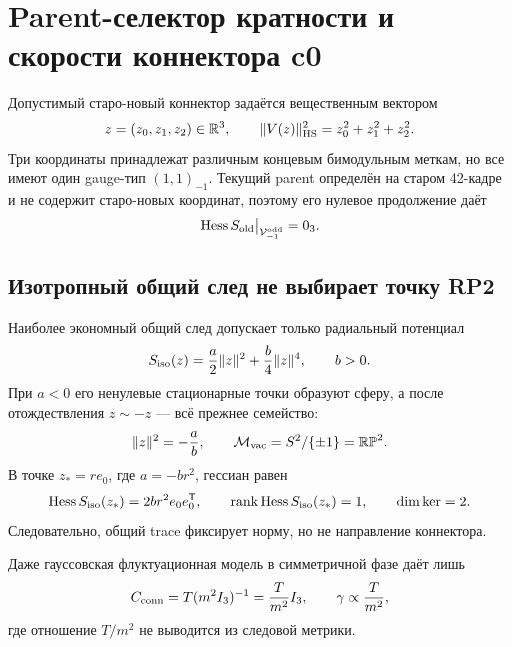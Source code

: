 \chapter{Parent-селектор кратности и скорости коннектора c0}
\label{ch:v8-baryon-c0-connector-multiplicity-and-rate-parent-selector-gate}

Допустимый старо-новый коннектор задаётся вещественным вектором
\begin{equation}
 z=(z_0,z_1,z_2)\in\mathbb R^3,
 \qquad \lVert V(z)\rVert_{\rm HS}^2=z_0^2+z_1^2+z_2^2.
 \label{eq:v8-baryon-c0-connector-multiplicity-trace-norm}
\end{equation}
Три координаты принадлежат различным концевым бимодульным меткам, но все
имеют один gauge-тип $(1,1)_{-1}$. Текущий parent определён на старом
42-кадре и не содержит старо-новых координат, поэтому его нулевое
продолжение даёт
\begin{equation}
 \operatorname{Hess} S_{\rm old}\big|_{\mathcal V_{-1}^{\rm odd}}=0_3.
 \label{eq:v8-baryon-c0-old-parent-zero-connector-hessian}
\end{equation}

\section{Изотропный общий след не выбирает точку RP2}

Наиболее экономный общий след допускает только радиальный потенциал
\begin{equation}
 S_{\rm iso}(z)=\frac a2\lVert z\rVert^2
 +\frac b4\lVert z\rVert^4,
 \qquad b>0.
 \label{eq:v8-baryon-c0-isotropic-connector-parent}
\end{equation}
При $a<0$ его ненулевые стационарные точки образуют сферу, а после
отождествления $z\sim-z$ --- всё прежнее семейство:
\begin{equation}
 \lVert z\rVert^2=-\frac ab,
 \qquad \mathcal M_{\rm vac}=S^2/\{\pm1\}=\mathbb{RP}^2.
 \label{eq:v8-baryon-c0-isotropic-vacuum-rp2}
\end{equation}
В точке $z_*=r e_0$, где $a=-br^2$, гессиан равен
\begin{equation}
 \operatorname{Hess} S_{\rm iso}(z_*)=2br^2 e_0e_0^{\mathsf T},
 \qquad \operatorname{rank}\operatorname{Hess} S_{\rm iso}(z_*)=1,
 \qquad \dim\ker=2.
 \label{eq:v8-baryon-c0-isotropic-parent-two-flat-directions}
\end{equation}
Следовательно, общий trace фиксирует норму, но не направление коннектора.

Даже гауссовская флуктуационная модель в симметричной фазе даёт лишь
\begin{equation}
 C_{\rm conn}=T(m^2I_3)^{-1}=\frac{T}{m^2}I_3,
 \qquad \gamma\propto\frac{T}{m^2},
 \label{eq:v8-baryon-c0-isotropic-gaussian-rate}
\end{equation}
где отношение $T/m^2$ не выводится из следовой метрики.

